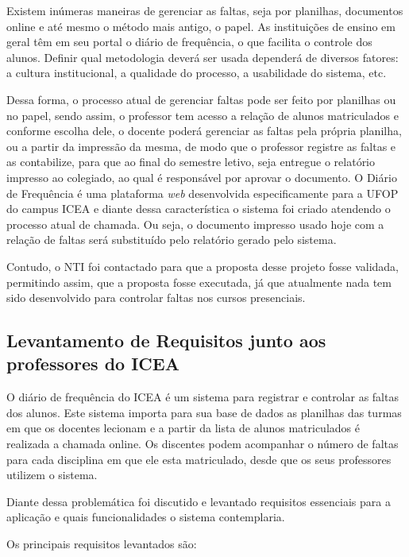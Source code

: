 \documentclass[
  12pt,       %
  openright,      %
  oneside,      %
  a4paper,      %
  english,      %
  french,        %
  spanish,     %
  brazil        %
  ]{abntex2-decsi}
\begin{document}
        Existem inúmeras maneiras de gerenciar as faltas, seja por planilhas, documentos online e até mesmo o método mais antigo, o papel. As instituições de ensino em geral têm em seu portal o diário de frequência, o que facilita o controle dos alunos. Definir qual metodologia deverá ser usada dependerá de diversos fatores: a cultura institucional, a qualidade do processo, a usabilidade do sistema, etc. 
                
        Dessa forma, o processo atual de gerenciar faltas pode ser feito por planilhas ou no papel, sendo assim, o professor tem acesso a relação de alunos matriculados e conforme escolha dele, o docente poderá gerenciar as faltas pela própria planilha, ou a partir da impressão da mesma, de modo que o professor registre as faltas e as contabilize, para que ao final do semestre letivo, seja entregue o relatório impresso ao colegiado, ao qual é responsável por aprovar o documento. 
        O Diário de Frequência é uma plataforma \textit{web} desenvolvida especificamente para a UFOP do campus ICEA e diante dessa característica o sistema foi criado atendendo o processo atual de chamada. Ou seja, o documento impresso usado hoje com a relação de faltas será substituído pelo relatório gerado pelo sistema. 
        
        Contudo, o NTI foi contactado para que a proposta desse projeto fosse validada, permitindo assim, que a proposta fosse executada, já que atualmente nada tem sido desenvolvido para controlar faltas nos cursos presenciais.
        
        \subsection{Levantamento de Requisitos junto aos professores do ICEA }
        
        O diário de frequência do ICEA é um sistema para registrar e controlar as faltas dos alunos. Este sistema importa para sua base de dados as planilhas das turmas em que os docentes lecionam e a partir da lista de alunos matriculados é realizada a chamada online. Os discentes podem acompanhar o número de faltas para cada disciplina em que ele esta matriculado, desde que os seus professores utilizem o sistema.

		Diante dessa problemática foi discutido e levantado requisitos essenciais para a aplicação e quais funcionalidades o sistema contemplaria. 
        
        Os principais requisitos levantados são:
      
\end{document}
